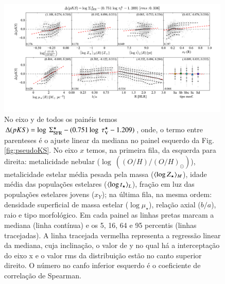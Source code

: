 \begin{figure}
	\centering
	\includegraphics[width=0.99\textwidth]{figuras/deltapKS.pdf}
	\caption[Resíduos da {\em pseudo-KS}.]
	{No eixo y de todos os painéis temos $\Delta(pKS) = \log\ \Sigma_{\mathrm{SFR}}^\star - (0.751 \log\ \tau_{\mathrm{V}}^\star -
1.209)$, onde, o termo entre parenteses é o ajuste linear da mediana no painel esquerdo da Fig.
\ref{fig:pseudoKS}. No eixo $x$ temos, na primeira fila, da esquerda para direita: metalicidade
nebular ($\log\ ((O/H)/(O/H)_\odot)$), metalicidade estelar média pesada pela massa ($\meanM{\log
Z_\star}$), idade média das populações estelares ($\meanL{\log t_\star}$), fração em luz das
populações estelares jovens ($x_Y$); na última fila, na mesma ordem: densidade superficial de massa
estelar ($\log \mu_\star$), relação axial ($b/a$), raio e tipo morfológico. Em cada painel as linhas
pretas marcam a mediana (linha contínua) e os 5, 16, 64 e 95 percentis (linhas tracejadas). A
linha tracejada vermelha representa a regressão linear da mediana, cuja inclinação, o valor de y no
qual há a interceptação do eixo x e o valor rms da distribuição estão no canto superior direito. O
número no canfo inferior esquerdo é o coeficiente de correlação de Spearman.}
	\label{fig:deltapKS}
\end{figure}

